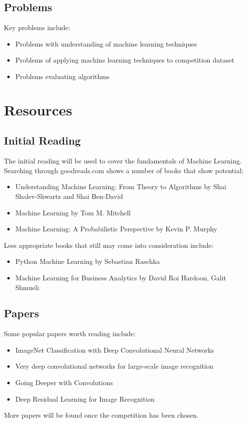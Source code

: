 \documentclass[proposal]{cmpreport}
\begin{document}
\subsection{Problems}
Key problems include:
\begin{itemize}
	\item Problems with understanding of machine learning techniques
    \item Problems of applying machine learning techniques to competition dataset
    \item Problems evaluating algorithms
\end{itemize}
\section{Resources}
\subsection{Initial Reading}
The initial reading will be used to cover the fundamentals of Machine Learning.
Searching through goodreads.com shows a number of books that show potential:
\begin{itemize}
	\item Understanding Machine Learning: From Theory to Algorithms by Shai Shalev-Shwartz and Shai Ben-David
    \item Machine Learning by Tom M. Mitchell
    \item Machine Learning: A Probabilistic Perspective by Kevin P. Murphy
\end{itemize}
Less appropriate books that still may come into consideration include:
\begin{itemize}
\item Python Machine Learning by Sebastian Raschka
\item Machine Learning for Business Analytics by David Roi Hardoon, Galit Shmueli
\end{itemize}
\subsection{Papers}
Some popular papers worth reading include:
\begin{itemize}
\item ImageNet Classification with Deep Convolutional Neural Networks
\item Very deep convolutional networks for large-scale image recognition
\item Going Deeper with Convolutions
\item Deep Residual Learning for Image Recognition
\end{itemize}
More papers will be found once the competition has been chosen.
\end{document}
